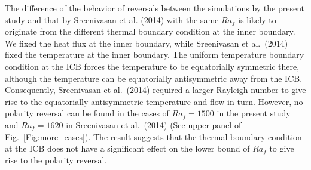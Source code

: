 The difference of the behavior of reversals between the simulations by the present study and that by Sreenivasan et al. (2014) with the same $Ra_{f}$ is likely to originate from the different thermal boundary condition at the inner boundary. 
We fixed the heat flux at the inner boundary, while Sreenivasan et al.\ (2014) fixed the temperature at the inner boundary. 
{\color{teal}
The uniform temperature boundary condition at the ICB forces the temperature to be equatorially symmetric there, although the temperature can be equatorially antisymmetric away from the ICB.
}
Consequently, Sreenivasan et al.\ (2014) required a larger Rayleigh number to give rise to the equatorially antisymmetric temperature and flow in turn. 
However, no polarity reversal can be found in the cases of $Ra_f = 1500$ in the present study and $Ra_f = 1620$ in Sreenivasan et al.\ (2014) (See {\color{magenta}upper} panel of Fig.~\ref{Fig:more_cases}). 
The result suggests that the thermal boundary condition at the ICB does not have a significant effect on the lower bound of $Ra_f$ to give rise to the polarity reversal.



